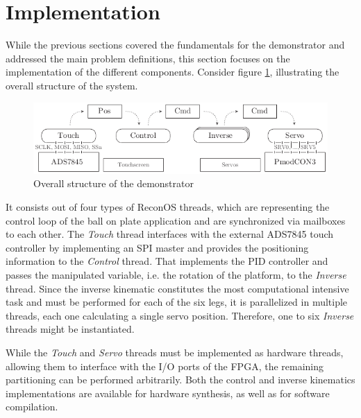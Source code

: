 \section{Implementation}
While the previous sections covered the fundamentals for the demonstrator and
addressed the main problem definitions, this section focuses on the
implementation of the different components. Consider figure
\ref{fig:demo_structure}, illustrating the overall structure of the system.
\begin{figure}
	\centering
	\includegraphics{../figures/demo_structure}
	\caption{Overall structure of the demonstrator}
	\label{fig:demo_structure}
\end{figure}
It consists out of four types of ReconOS threads, which are representing the
control loop of the ball on plate application and are synchronized via
mailboxes to each other. The \emph{Touch} thread interfaces with the external
ADS7845 touch controller by implementing an \ac{SPI} master and provides the
positioning information to the \emph{Control} thread. That implements the
\ac{PID} controller and passes the manipulated variable, i.e. the rotation of
the platform, to the \emph{Inverse} thread. Since the inverse kinematic
constitutes the most computational intensive task and must be performed for
each of the six legs, it is parallelized in multiple threads, each one
calculating a single servo position. Therefore, one to six
\emph{Inverse} threads might be instantiated.

While the \emph{Touch} and \emph{Servo} threads must be implemented as
hardware threads, allowing them to interface with the I/O ports of the FPGA,
the remaining partitioning can be performed arbitrarily. Both the control and
inverse kinematics implementations are available for hardware synthesis, as
well as for software compilation.

